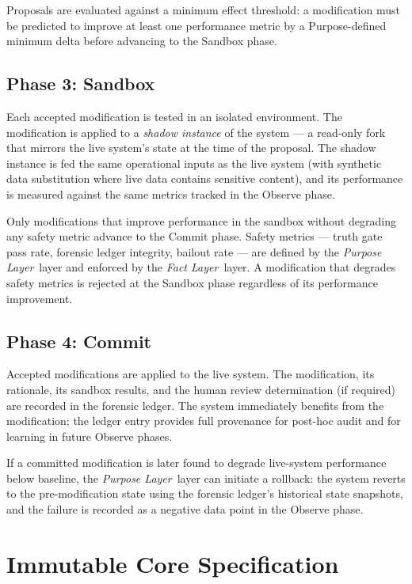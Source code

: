 \documentclass[12pt]{article}
\newcommand{\purpose}{\textit{Purpose Layer}}
\newcommand{\fact}{\textit{Fact Layer}}
\begin{document}
Proposals are evaluated against a minimum effect threshold: a modification must be predicted to improve at least one performance metric by a Purpose-defined minimum delta before advancing to the Sandbox phase.

\subsection{Phase 3: Sandbox}
Each accepted modification is tested in an isolated environment. The modification is applied to a \textit{shadow instance} of the system — a read-only fork that mirrors the live system's state at the time of the proposal. The shadow instance is fed the same operational inputs as the live system (with synthetic data substitution where live data contains sensitive content), and its performance is measured against the same metrics tracked in the Observe phase.

Only modifications that improve performance in the sandbox without degrading any safety metric advance to the Commit phase. Safety metrics — truth gate pass rate, forensic ledger integrity, bailout rate — are defined by the \purpose\ layer and enforced by the \fact\ layer. A modification that degrades safety metrics is rejected at the Sandbox phase regardless of its performance improvement.

\subsection{Phase 4: Commit}
Accepted modifications are applied to the live system. The modification, its rationale, its sandbox results, and the human review determination (if required) are recorded in the forensic ledger. The system immediately benefits from the modification; the ledger entry provides full provenance for post-hoc audit and for learning in future Observe phases.

If a committed modification is later found to degrade live-system performance below baseline, the \purpose\ layer can initiate a rollback: the system reverts to the pre-modification state using the forensic ledger's historical state snapshots, and the failure is recorded as a negative data point in the Observe phase.

\section{Immutable Core Specification}
\label{sec:immutable-core}
\end{document}
